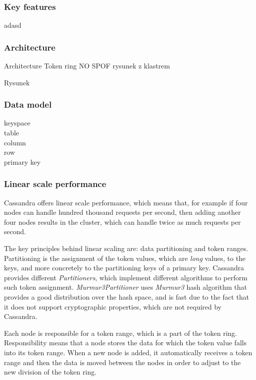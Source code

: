 \subsubsection{Key features}
\begin{enumerate*}
\item adasd
\end{enumerate*}

\subsubsection{Architecture}
Architecture
 Token ring
 NO SPOF
 rysunek z klastrem


Rysunek

\subsubsection{Data model}
\begin{description}
\item[keyspace]
\item[table]
\item[column]
\item[row]
\item[primary key]
\end{description}

\subsubsection{Linear scale performance}
Cassandra offers linear scale performance, which means that, for example if four nodes can handle hundred thousand requests per second, then adding another four nodes results in the cluster, which can handle twice as much requests per second. 

The key principles behind linear scaling are:  data partitioning and token ranges. 
Partitioning is the assignment of the token values, which are \emph{long} values, to the keys, and more concretely to the partitioning keys of a primary key. Cassandra provides different \emph{Partitioners}, which implement different algorithms to perform such token assignment. \emph{Murmur3Partitioner} uses \emph{Murmur3} hash algorithm that provides a good distribution over the hash space, and is fast due to the fact that it does not support cryptographic properties, which are not required by Cassandra.

Each node is responsible for a token range, which is a part of the token ring. Responsibility means that a node stores the data for which the token value falls into its token range. When a new node is added, it automatically receives a token range and then the data is moved between the nodes in order to adjust to the new division of the token ring.

